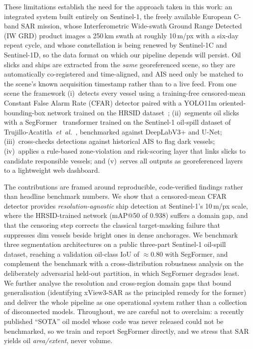 \documentclass{ieeeaccess}
\begin{document}
These limitations establish the need for the approach taken in this work: an integrated system built entirely on Sentinel-1, the freely available European C-band SAR mission, whose Interferometric Wide-swath Ground Range Detected (IW GRD) product images a 250\,km swath at roughly 10\,m/px with a six-day repeat cycle, and whose constellation is being renewed by Sentinel-1C and Sentinel-1D, so the data format on which our pipeline depends will persist. Oil slicks and ships are extracted from the \emph{same} georeferenced scene, so they are automatically co-registered and time-aligned, and AIS need only be matched to the scene's known acquisition timestamp rather than to a live feed. From one scene the framework (i)~detects every vessel using a training-free censored-mean Constant False Alarm Rate (CFAR) detector paired with a YOLO11m oriented-bounding-box network trained on the HRSID dataset~\cite{4}; (ii)~segments oil slicks with a SegFormer~\cite{5} transformer trained on the Sentinel-1 oil-spill dataset of Trujillo-Acatitla~\textit{et~al.}~\cite{6}, benchmarked against DeepLabV3+ and U-Net; (iii)~cross-checks detections against historical AIS to flag dark vessels; (iv)~applies a rule-based zone-violation and risk-scoring layer that links slicks to candidate responsible vessels; and (v)~serves all outputs as georeferenced layers to a lightweight web dashboard.

The contributions are framed around reproducible, code-verified findings rather than headline benchmark numbers. We show that a censored-mean CFAR detector provides \emph{resolution-agnostic} ship detection at Sentinel-1's 10\,m/px scale, where the HRSID-trained network (mAP@50 of $0.938$) suffers a domain gap, and that the censoring step corrects the classical target-masking failure that suppresses dim vessels beside bright ones in dense anchorages. We benchmark three segmentation architectures on a public three-part Sentinel-1 oil-spill dataset, reaching a validation oil-class IoU of $\approx0.80$ with SegFormer, and complement the benchmark with a cross-distribution robustness analysis on the deliberately adversarial held-out partition, in which SegFormer degrades least. We further analyse the resolution and cross-region domain gaps that bound generalisation (identifying xView3-SAR as the principled remedy for the former) and deliver the whole pipeline as one operational system rather than a collection of disconnected models. Throughout, we are careful not to overclaim: a recently published ``SOTA'' oil model whose code was never released could not be benchmarked, so we train and report SegFormer directly, and we stress that SAR yields oil \emph{area/extent}, never volume.
\end{document}
